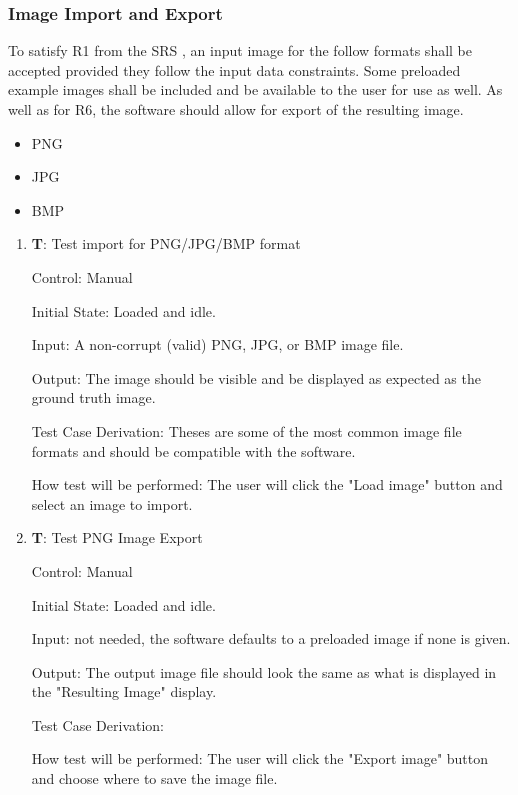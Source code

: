 \documentclass[12pt, titlepage]{article}
\newcounter{testnum} %
\begin{document}
\subsubsection{Image Import and Export}

To satisfy R1 from the SRS \citep{SRS}, an input image for the follow formats shall be 
accepted provided they follow the input data constraints.
Some preloaded example images shall be included and be available to the user for use as well.
As well as for R6, the software should allow for export of the resulting image.

\begin{itemize}
  \item{PNG}
  \item{JPG}
  \item{BMP\\}
\end{itemize}

\begin{enumerate}

  \item{\textbf{T\thetestnum \label{T_inputImage}}: Test import for PNG/JPG/BMP format\\}
            
  Control: Manual
            
  Initial State: Loaded and idle.
            
  Input: A non-corrupt (valid) PNG, JPG, or BMP image file.
            
  Output: The image should be visible and be displayed as expected as the ground truth image.
            
  Test Case Derivation: Theses are some of the most common image file formats and should be compatible with the software.
            
  How test will be performed: The user will click the "Load image" button and select an image to import.

  \item{\textbf{T\thetestnum \label{T_exportImage}}: Test PNG Image Export\\}
              
  Control: Manual
            
  Initial State: Loaded and idle.
            
  Input: not needed, the software defaults to a preloaded image if none is given.
            
  Output: The output image file should look the same as what is displayed in the "Resulting Image" display.

  Test Case Derivation: 

  How test will be performed: The user will click the "Export image" button and choose where to save the image file.

\end{enumerate}
\end{document}
